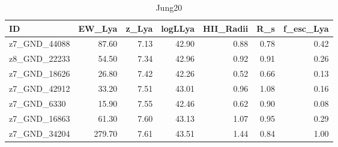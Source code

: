 \begin{table}[H]
\caption{Jung20}
\label{Jung20}
\begin{tabular}{lrrrrrr}
\toprule
ID & EW_Lya & z_Lya & logLLya & HII_Radii & R_s & f_esc_Lya \\
\midrule
z7_GND_44088 & 87.60 & 7.13 & 42.90 & 0.88 & 0.78 & 0.42 \\
z8_GND_22233 & 54.50 & 7.34 & 42.96 & 0.92 & 0.91 & 0.26 \\
z7_GND_18626 & 26.80 & 7.42 & 42.26 & 0.52 & 0.66 & 0.13 \\
z7_GND_42912 & 33.20 & 7.51 & 43.01 & 0.96 & 1.08 & 0.16 \\
z7_GND_6330 & 15.90 & 7.55 & 42.46 & 0.62 & 0.90 & 0.08 \\
z7_GND_16863 & 61.30 & 7.60 & 43.13 & 1.07 & 0.95 & 0.29 \\
z7_GND_34204 & 279.70 & 7.61 & 43.51 & 1.44 & 0.84 & 1.00 \\
\bottomrule
\end{tabular}
\end{table}
